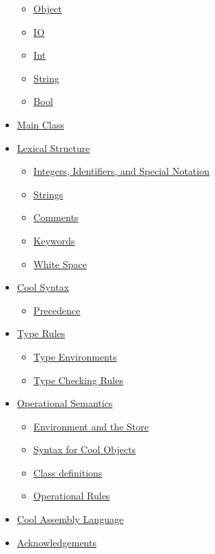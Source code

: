 \documentclass[]{article}
\begin{document}
\begin{itemize}
  \begin{itemize}
  \itemsep1pt\parskip0pt
  \item
    \href{node27.html}{Object}
  \item
    \href{node28.html}{IO}
  \item
    \href{node29.html}{Int}
  \item
    \href{node30.html}{String}
  \item
    \href{node31.html}{Bool}
  \end{itemize}
\item
  \href{node32.html}{Main Class}
\item
  \href{node33.html}{Lexical Structure}

  \begin{itemize}
  \itemsep1pt\parskip0pt
  \item
    \href{node34.html}{Integers, Identifiers, and Special Notation}
  \item
    \href{node35.html}{Strings}
  \item
    \href{node36.html}{Comments}
  \item
    \href{node37.html}{Keywords}
  \item
    \href{node38.html}{White Space}
  \end{itemize}
\item
  \href{node39.html}{Cool Syntax}

  \begin{itemize}
  \itemsep1pt\parskip0pt
  \item
    \href{node40.html}{Precedence}
  \end{itemize}
\item
  \href{node41.html}{Type Rules}

  \begin{itemize}
  \itemsep1pt\parskip0pt
  \item
    \href{node42.html}{Type Environments}
  \item
    \href{node43.html}{Type Checking Rules}
  \end{itemize}
\item
  \href{node44.html}{Operational Semantics}

  \begin{itemize}
  \itemsep1pt\parskip0pt
  \item
    \href{node45.html}{Environment and the Store}
  \item
    \href{node46.html}{Syntax for Cool Objects}
  \item
    \href{node47.html}{Class definitions}
  \item
    \href{node48.html}{Operational Rules}
  \end{itemize}
\item
  \href{node51.html}{Cool Assembly Language} \\
\item
  \href{node49.html}{Acknowledgements}
\end{itemize}
\end{document}
